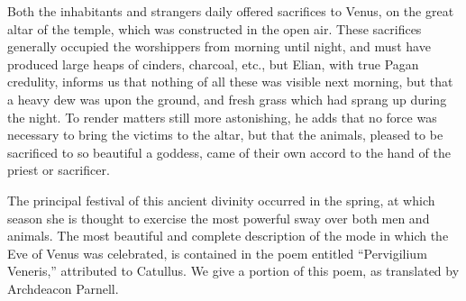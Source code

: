 \documentclass[a4paper, 11pt, oneside, polutonikogreek, english]{article}
\begin{document}
Both the inhabitants and strangers daily offered sacrifices to Venus, on the great altar of the temple, which was constructed in the open air. These sacrifices generally occupied the worshippers from morning until night, and must have produced large heaps of cinders, charcoal, etc., but Elian, with true Pagan credulity, informs us that nothing of all these was visible next morning, but that a heavy dew was upon the ground, and fresh grass which had sprang up during the night. To render matters still more astonishing, he adds that no force was necessary to bring the victims to the altar, but that the animals, pleased to be sacrificed to so beautiful a goddess, came of their own accord to the hand of the priest or sacrificer.

The principal festival of this ancient divinity occurred in the spring, at which season she is thought to exercise the most powerful sway over both men and animals. The most beautiful and complete description of the mode in which the Eve of Venus was celebrated, is contained in the poem entitled ``Pervigilium Veneris,'' attributed to Catullus. We give a portion of this poem, as translated by Archdeacon Parnell.
\end{document}
